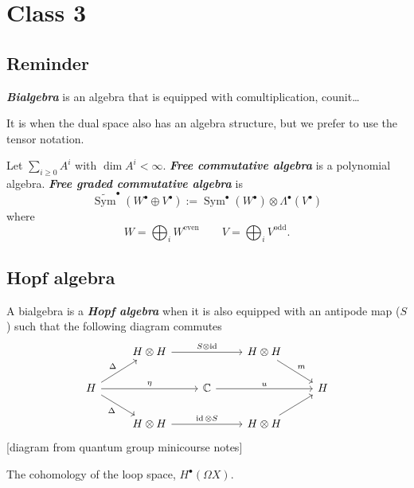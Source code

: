 \section{Class 3}

\subsection{Reminder}

\begin{defn}
	\textit{\textbf{Bialgebra}} is an algebra that is  equipped with comultiplication, counit…
\end{defn}

\begin{remark}
	It is when the dual space also has an algebra structure, but we prefer to use the tensor notation.
\end{remark}

Let $\sum_{i \geq 0}A^i$ with $\dim A^i<\infty$. \textit{\textbf{Free commutative algebra}} is a polynomial algebra.  \textit{\textbf{Free graded commutative algebra}} is
\[\widetilde{\operatorname{Sym}}^\bullet(W^\bullet \oplus V^\bullet):=\operatorname{Sym}^\bullet(W^\bullet)\otimes \Lambda^\bullet(V^\bullet)\]
where
\[W=\bigoplus_{i} W^{\operatorname{even}} \qquad V=\bigoplus_{i}V^{\operatorname{odd}}. \]

\subsection{Hopf algebra}

\begin{defn}
	A bialgebra is a \textit{\textbf{Hopf algebra}} when it is also equipped with an antipode map ($S$) such that the following diagram commutes
\[\begin{tikzcd}
	&H\otimes H\arrow[rr,"S\otimes \operatorname{id}"]&&H\otimes H\arrow[rd,"m"]\\
	H\arrow[ur,"\Delta"]\arrow[dr,swap,"\Delta"]\arrow[rr,"\eta"]&&\mathbb{C}\arrow[rr,"u"]&&H\\
								     &H\otimes H\arrow[rr,"\operatorname{id}\otimes S"]&&H\otimes H\arrow[ur]
\end{tikzcd}\]
[diagram from quantum group minicourse notes]

	\end{defn}

\begin{example}
	The cohomology of the loop space, $H^{\bullet}(\Omega X)$.
\end{example}

